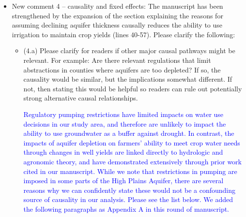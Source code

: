 \documentclass[
]{article}
\begin{document}
\begin{itemize}
\item New comment 4 – causality and fixed effects: The manuscript has been strengthened by the expansion of the section explaining the reasons for assuming declining aquifer thickness causally reduces the ability to use irrigation to maintain crop yields (lines 40-57). Please clarify the following:

  \begin{itemize}
  \item (4.a) Please clarify for readers if other major causal pathways might be relevant. For example: Are there relevant regulations that limit abstractions in counties where aquifers are too depleted? If so, the causality would be similar, but the implications somewhat different. If not, then stating this would be helpful so readers can rule out potentially strong alternative causal relationships.


  \textcolor{blue}{Regulatory pumping restrictions have limited impacts on water use decisions in our study area, and therefore are unlikely to impact the ability to use groundwater as a buffer against drought. In contrast, the impacts of aquifer depletion on farmers' ability to meet crop water needs through changes in well yields are linked directly to hydrologic and agronomic theory, and have demonstrated extensively through prior work cited in our manuscript. While we note that restrictions in pumping are imposed in some parts of the High Plains Aquifer, there are several reasons why we can confidently state these would not be a confounding source of causality in our analysis. Please see the list below. We added the following paragraphs as Appendix A in this round of manuscript.}


\end{itemize}
\end{itemize}
\end{document}
